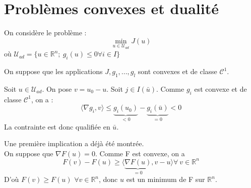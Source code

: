 \section{Problèmes convexes et dualité}
On considère le problème :
	\[\min_{u\in \mathcal{U}_{ad}} J(u)\]
où $\mathcal{U}_{ad}=\{u\in\mathbb{R}^n;\ g_i(u)\leq 0 \forall i\in I\}$

\bigskip
On suppose que les applications $J,g_1,...,g_l$ sont convexes et de classe $\mathcal{C}^1$.


\begin{dem}
Soit $u\in\mathcal{U}_{ad}$. On pose $v=u_0-u$. Soit $j\in I(\bar{u})$. Comme $g_i$ est convexe et de classe $\mathcal{C}^1$, on a :
	\[\langle \nabla g_i, v\rangle \leq \underbrace{g_i(u_0)}_{<0}-\underbrace{g_i(\bar{u})}_{=0}<0\]
La contrainte est donc qualifiée en $\bar{u}$.
\end{dem}


\begin{dem}
Une première implication a déjà été montrée.\\
On suppose que $\nabla F(u)=0$. Comme F est convexe, on a \[F(v)-F(u)\geq \langle \underbrace{\nabla F(u)}_{=0},v-u\rangle \forall\ v\in\mathbb{R}^n\]
D'où $F(v)\geq F(u)$ $\forall v\in\mathbb{R}^n$, donc $u$ est un minimum de F sur $\mathbb{R}^n$.
\end{dem}


